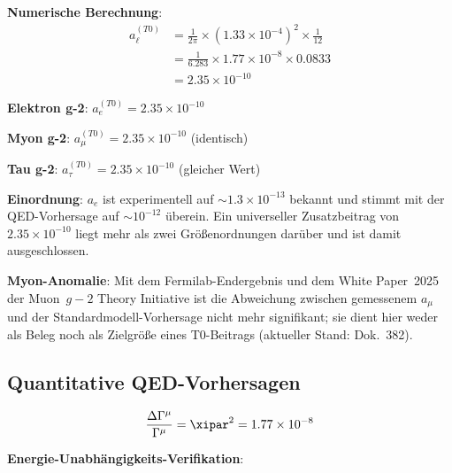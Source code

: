	\textbf{Numerische Berechnung}:
	\begin{align}
		a_{\ell}^{(T0)} &= \frac{1}{2\pi} \times (1.33 \times 10^{-4})^2 \times \frac{1}{12} \\
		&= \frac{1}{6.283} \times 1.77 \times 10^{-8} \times 0.0833 \\
		&= 2.35 \times 10^{-10}
	\end{align}
	
	\begin{tcolorbox}[colback=blue!5!white,colframe=blue!75!black,title=Universelle Lepton-Vorhersage]
		\textbf{Elektron g-2}: $a_e^{(T0)} = 2.35 \times 10^{-10}$
		
		\textbf{Myon g-2}: $a_{\mu}^{(T0)} = 2.35 \times 10^{-10}$ (identisch)
		
		\textbf{Tau g-2}: $a_{\tau}^{(T0)} = 2.35 \times 10^{-10}$ (gleicher Wert)
		
		\textbf{Einordnung}: $a_e$ ist experimentell auf $\sim1.3\times10^{-13}$ bekannt und stimmt mit der QED-Vorhersage auf $\sim10^{-12}$ überein. Ein universeller Zusatzbeitrag von $2.35\times10^{-10}$ liegt mehr als zwei Größenordnungen darüber und ist damit ausgeschlossen.
		
		\textbf{Myon-Anomalie}: Mit dem Fermilab-Endergebnis und dem White Paper~2025 der Muon~$g-2$ Theory Initiative ist die Abweichung zwischen gemessenem $a_\mu$ und der Standardmodell-Vorhersage nicht mehr signifikant; sie dient hier weder als Beleg noch als Zielgröße eines T0-Beitrags (aktueller Stand: Dok.~382).
	\end{tcolorbox}
	
	\subsection{Quantitative QED-Vorhersagen}
	
	\begin{equation}
		\frac{\Delta\Gamma^{\mu}}{\Gamma^{\mu}} = \xipar^2 = 1.77 \times 10^{-8}
		\label{eq:quantitative_qed_correction}
	\end{equation}
	
	\textbf{Energie-Unabhängigkeits-Verifikation}:
	\begin{table}[htbp]
		\centering
		\caption{Energie-unabhängige T0-Korrekturen vs. Standardmodell}
	\end{table}


